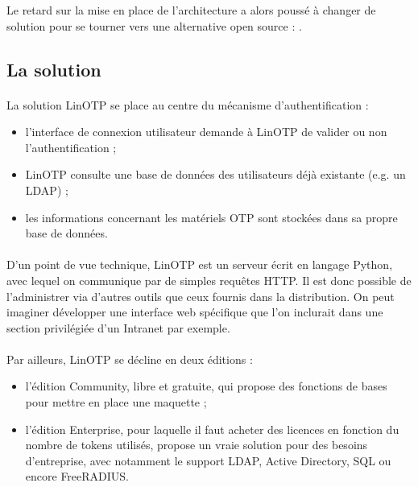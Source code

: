 Le retard sur la mise en place de l'architecture a alors poussé \asmile{} à changer de solution pour se tourner vers une alternative open source : \alinotp{}.


\subsection{La solution \alinotp{}}

\paragraph{}
La solution LinOTP se place au centre du mécanisme d'authentification :

\begin{itemize}
	\item l'interface de connexion utilisateur demande à LinOTP de valider ou non l'authentification ;
	\item LinOTP consulte une base de données des utilisateurs déjà existante (e.g. un LDAP) ;
	\item les informations concernant les matériels OTP sont stockées dans sa propre base de données.
\end{itemize}

\paragraph{}
D'un point de vue technique, LinOTP est un serveur écrit en langage Python, avec lequel on communique par de simples requêtes HTTP.
Il est donc possible de l'administrer via d'autres outils que ceux fournis dans la distribution.
On peut imaginer développer une interface web spécifique que l'on inclurait dans une section privilégiée d'un Intranet par exemple.

\paragraph{}
Par ailleurs, LinOTP se décline en deux éditions :

\begin{itemize}
	\item l'édition Community, libre et gratuite, qui propose des fonctions de bases pour mettre en place une maquette ;
	\item l'édition Enterprise, pour laquelle il faut acheter des licences en fonction du nombre de tokens utilisés, propose un vraie solution pour des besoins d'entreprise, avec notamment le support LDAP, Active Directory, SQL ou encore FreeRADIUS.
\end{itemize}

